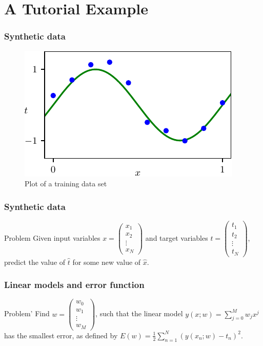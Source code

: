 \documentclass{beamer}
\begin{document}
\section{A Tutorial Example}

\begin{frame}
    \frametitle{Synthetic data}
    \begin{figure}
        \caption{Plot of a training data set}
        \includegraphics{Figure_4.pdf}
    \end{figure}
\end{frame}

\begin{frame}
    \frametitle{Synthetic data}
    \begin{block}{Problem}
        Given input variables $x=\begin{pmatrix}
            x_{1} \\
            x_{2} \\
            \vdots \\
            x_{N}
        \end{pmatrix}$ and target variables $t=\begin{pmatrix}
            t_{1} \\
            t_{2} \\
            \vdots \\
            t_{N}
        \end{pmatrix}$, predict the value of $\hat{t}$ for some new value of $\hat{x}$.
    \end{block}
\end{frame}

\begin{frame}
    \frametitle{Linear models and error function}
    \begin{block}{Problem'}
        Find $w=\begin{pmatrix}
            w_{0} \\
            w_{1} \\
            \vdots \\
            w_{M}
        \end{pmatrix}$, such that the linear model $y(x;w)=\sum_{j=0}^{M}w_{j}x^{j}$ has the smallest error, as defined by $E(w)=\frac{1}{2}\sum_{n=1}^{N}(y(x_{n};w)-t_{n})^{2}$.
    \end{block}
\end{frame}
\end{document}
